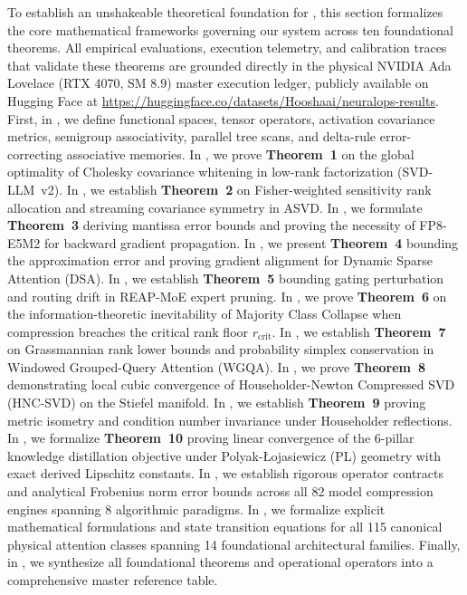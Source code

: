 To establish an unshakeable theoretical foundation for \neuralops{}, this section formalizes the core mathematical frameworks governing our system across ten foundational theorems. All empirical evaluations, execution telemetry, and calibration traces that validate these theorems are grounded directly in the physical NVIDIA Ada Lovelace (RTX 4070, SM 8.9) master execution ledger, publicly available on Hugging Face at \url{https://huggingface.co/datasets/Hooshaai/neuralops-results}. First, in , we define functional spaces, tensor operators, activation covariance metrics, semigroup associativity, parallel tree scans, and delta-rule error-correcting associative memories. In , we prove \textbf{Theorem~1} on the global optimality of Cholesky covariance whitening in low-rank factorization (SVD-LLM~v2). In , we establish \textbf{Theorem~2} on Fisher-weighted sensitivity rank allocation and streaming covariance symmetry in ASVD. In , we formulate \textbf{Theorem~3} deriving mantissa error bounds and proving the necessity of FP8-E5M2 for backward gradient propagation. In , we present \textbf{Theorem~4} bounding the approximation error and proving gradient alignment for Dynamic Sparse Attention (DSA). In , we establish \textbf{Theorem~5} bounding gating perturbation and routing drift in REAP-MoE expert pruning. In , we prove \textbf{Theorem~6} on the information-theoretic inevitability of Majority Class Collapse when compression breaches the critical rank floor $r_{\text{crit}}$. In , we establish \textbf{Theorem~7} on Grassmannian rank lower bounds and probability simplex conservation in Windowed Grouped-Query Attention (WGQA). In , we prove \textbf{Theorem~8} demonstrating local cubic convergence of Householder-Newton Compressed SVD (HNC-SVD) on the Stiefel manifold. In , we establish \textbf{Theorem~9} proving metric isometry and condition number invariance under Householder reflections. In , we formalize \textbf{Theorem~10} proving linear convergence of the 6-pillar knowledge distillation objective under Polyak-\L{}ojasiewicz (PL) geometry with exact derived Lipschitz constants. In , we establish rigorous operator contracts and analytical Frobenius norm error bounds across all 82 model compression engines spanning 8 algorithmic paradigms. In , we formalize explicit mathematical formulations and state transition equations for all 115 canonical physical attention classes spanning 14 foundational architectural families. Finally, in , we synthesize all foundational theorems and operational operators into a comprehensive master reference table.

